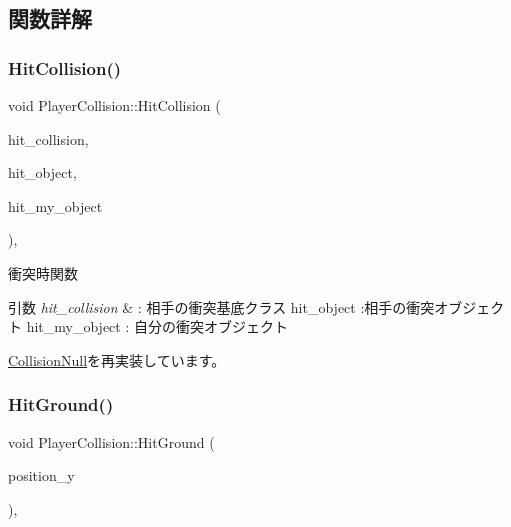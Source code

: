 \subsection{関数詳解}
\mbox{\label{class_player_collision_ad937a5fd226e742270202bf4eff53767}} 
\subsubsection{\texorpdfstring{Hit\+Collision()}{HitCollision()}}
{\footnotesize\ttfamily void Player\+Collision\+::\+Hit\+Collision (\begin{DoxyParamCaption}\item[{\mbox{\hyperlink{class_collision_base}{Collision\+Base}} $\ast$}]{hit\+\_\+collision,  }\item[{\mbox{\hyperlink{class_collision_object}{Collision\+Object}} $\ast$}]{hit\+\_\+object,  }\item[{\mbox{\hyperlink{class_collision_object}{Collision\+Object}} $\ast$}]{hit\+\_\+my\+\_\+object }\end{DoxyParamCaption})\hspace{0.3cm}{\ttfamily [override]}, {\ttfamily [virtual]}}



衝突時関数 


\begin{DoxyParams}{引数}
{\em hit\+\_\+collision} & \+: 相手の衝突基底クラス hit\+\_\+object \+:相手の衝突オブジェクト hit\+\_\+my\+\_\+object \+: 自分の衝突オブジェクト \\
\hline
\end{DoxyParams}


\mbox{\hyperlink{class_collision_null_a580f507d8918865679feec3cc7b613d1}{Collision\+Null}}を再実装しています。

\mbox{\label{class_player_collision_a3522ce17b1e1752f2737c2243582ecb0}} 
\subsubsection{\texorpdfstring{Hit\+Ground()}{HitGround()}}
{\footnotesize\ttfamily void Player\+Collision\+::\+Hit\+Ground (\begin{DoxyParamCaption}\item[{float}]{position\+\_\+y }\end{DoxyParamCaption})\hspace{0.3cm}{\ttfamily [override]}, {\ttfamily [virtual]}}



